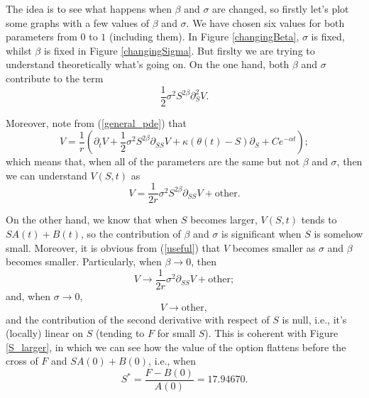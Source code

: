 \vspace{-0.3cm}
The idea is to see what happens when $\beta$ and $\sigma$ are changed, so firstly let's plot some graphs with a few values of $\beta$ and $\sigma$. We have chosen six values for both parameters from $0$ to $1$ (including them). In Figure \ref{changingBeta}, $\sigma$ is fixed, whilst $\beta$ is fixed in Figure \ref{changingSigma}. But firslty we are trying to understand theoretically what's going on. On the one hand, both $\beta$  and $\sigma$ contribute to the term 
\begin{equation}
	\frac{1}{2}\sigma^2S^{2\beta}\partial_S^2 V.
\end{equation}

Moreover, note from (\ref{general_pde}) that
\begin{equation}
	V = \frac{1}{r}\left(\partial_t V + \frac{1}{2}\sigma^2 S^{2\beta}\partial_{SS} V + \kappa\left(\theta(t) - S\right)\partial_S + Ce^{-\alpha t}\right);
\end{equation}
which means that, when all of the parameters are the same but not $\beta$ and $\sigma$, then we can understand $V(S,t)$ as
\begin{equation}\label{useful}
	V = \frac{1}{2r}\sigma^2 S^{2\beta}\partial_{SS} V + \text{other}.
\end{equation}

On the other hand, we know that when $S$ becomes larger, $V(S,t)$ tends to $S A(t) + B(t)$, so the contribution of $\beta$ and $\sigma$ is significant when $S$ is somehow small. Moreover, it is obvious from (\ref{useful}) that $V$ becomes smaller as $\sigma$ and $\beta$ becomes smaller. Particularly, when $\beta \to 0$, then
\begin{equation}
	V \to  \frac{1}{2r}\sigma^2\partial_{SS} V + \text{other};
\end{equation}
and, when $\sigma\to 0$, 
\begin{equation}
	V \to  \text{other},
\end{equation}
and the contribution of the second derivative with respect of $S$ is null, i.e., it's (locally) linear on $S$ (tending to $F$ for small $S$). This is coherent with Figure \ref{S_larger}, in which we can see how the value of the option flattens before the cross of $F$ and $S A(0) + B(0)$, i.e., when
\begin{equation}
	S^* = \frac{F-B(0)}{A(0)} = 17.94670.
\end{equation} 

